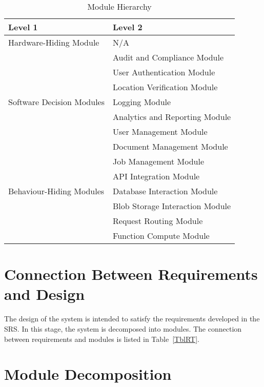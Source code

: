 \documentclass[12pt, titlepage]{article}
\begin{document}
\begin{table}[h!]
  \centering
  \begin{tabular}{p{} p{}}
    \toprule
    \textbf{Level 1}                                       &
    \textbf{Level 2}
    \\
    \midrule

    {Hardware-Hiding Module}                               & N/A
    \\
    \midrule

    \multirow{7}{0.3\textwidth}{Software Decision Modules} & Audit
    and Compliance Module
    \\
    & User Authentication Module      \\
    & Location Verification Module    \\
    & Logging Module                  \\
    & Analytics and Reporting Module  \\
    & User Management Module          \\
    & Document Management Module      \\
    & Job Management Module           \\
    \midrule

    \multirow{3}{0.3\textwidth}{Behaviour-Hiding Modules}  & {API
    Integration Module}
    \\
    & Database Interaction Module     \\
    & Blob Storage Interaction Module \\
    & Request Routing Module          \\
    & Function Compute Module         \\
    \bottomrule
  \end{tabular}
  \caption{Module Hierarchy}
  \label{TblMH}
\end{table}

\section{Connection Between Requirements and Design} \label{SecConnection}

The design of the system is intended to satisfy the requirements
developed in the SRS. In this stage, the system is decomposed into
modules. The connection between requirements and modules is listed
in Table~\ref{TblRT}.

\section{Module Decomposition} \label{SecMD}
\end{document}
